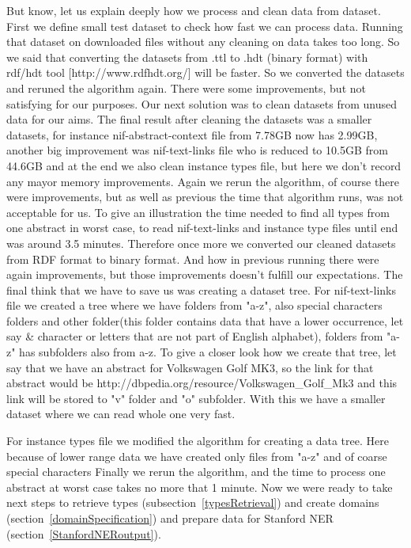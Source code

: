 \documentclass[thesis=M,english]{FITthesis}[2018/05/30]
\begin{document}
But know, let us explain deeply how we process and clean data from dataset. First we define small test dataset to check how fast we can process data. Running that dataset on downloaded files without any cleaning on data takes too long. So we said that converting the datasets from .ttl to .hdt (binary format) with rdf/hdt tool [http://www.rdfhdt.org/] will be faster. So we converted the datasets and reruned the algorithm again. There were some improvements, but not satisfying for our purposes. Our next solution was to clean datasets from unused data for our aims. The final result after cleaning the datasets was a smaller datasets, for instance nif-abstract-context file from 7.78GB now has 2.99GB, another big improvement was nif-text-links file who is reduced to 10.5GB from 44.6GB and at the end we also clean instance types file, but here we don't record any mayor memory improvements. Again we rerun the algorithm, of course there were improvements, but as well as previous the time that algorithm runs, was not acceptable for us. To give an illustration the time needed to find all types from one abstract in worst case, to read nif-text-links and instance type files until end was around 3.5 minutes. Therefore once more we converted our cleaned datasets from RDF format to binary format. And how in previous running there were again improvements, but those improvements doesn't fulfill our expectations. The final think that we have to save us was creating a dataset tree. For nif-text-links file we created a tree where we have folders from "a-z", also special characters folders and other folder(this folder contains data that have a lower occurrence, let say \& character or letters that are not part of English alphabet), folders from "a-z" has subfolders also from a-z. 
\linebreak To give a closer look how we create that tree, let say that we have an abstract for Volkswagen Golf MK3, so the link for that abstract would be http://dbpedia.org/resource/Volkswagen\_Golf\_Mk3 and this link will be stored to "v" folder and "o" subfolder. With this we have a smaller dataset where we can read whole one very fast.

For instance types file we modified the algorithm for creating a data tree. Here because of lower range data we have created only files from "a-z" and of coarse special characters
Finally we rerun the algorithm, and the time to process one abstract at worst case takes no more that 1 minute. Now we were ready to take next steps to retrieve types (subsection~\ref{typesRetrieval}) and create domains (section~\ref{domainSpecification}) and prepare data for Stanford NER (section~\ref{StanfordNERoutput}).
\end{document}
